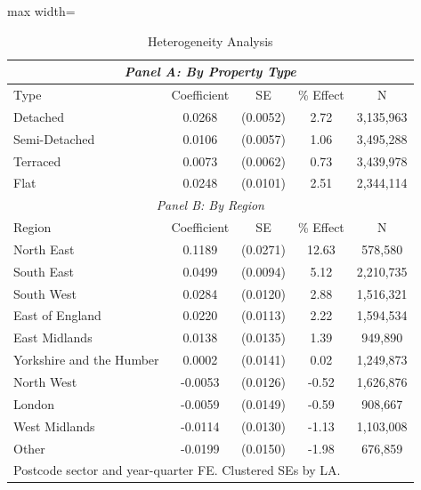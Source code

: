 \begin{table}[htbp]
\centering
\caption{Heterogeneity Analysis}
\label{tab:heterogeneity}
\begin{adjustbox}{max width=\textwidth}
\begin{tabular}{lcccc}
\hline\hline
\multicolumn{5}{c}{\textit{Panel A: By Property Type}} \\
\hline
Type & Coefficient & SE & \% Effect & N \\
\hline
Detached & 0.0268 & (0.0052) & 2.72 & 3,135,963 \\
Semi-Detached & 0.0106 & (0.0057) & 1.06 & 3,495,288 \\
Terraced & 0.0073 & (0.0062) & 0.73 & 3,439,978 \\
Flat & 0.0248 & (0.0101) & 2.51 & 2,344,114 \\
\hline
\multicolumn{5}{c}{\textit{Panel B: By Region}} \\
\hline
Region & Coefficient & SE & \% Effect & N \\
\hline
North East & 0.1189 & (0.0271) & 12.63 &   578,580 \\
South East & 0.0499 & (0.0094) & 5.12 & 2,210,735 \\
South West & 0.0284 & (0.0120) & 2.88 & 1,516,321 \\
East of England & 0.0220 & (0.0113) & 2.22 & 1,594,534 \\
East Midlands & 0.0138 & (0.0135) & 1.39 &   949,890 \\
Yorkshire and the Humber & 0.0002 & (0.0141) & 0.02 & 1,249,873 \\
North West & -0.0053 & (0.0126) & -0.52 & 1,626,876 \\
London & -0.0059 & (0.0149) & -0.59 &   908,667 \\
West Midlands & -0.0114 & (0.0130) & -1.13 & 1,103,008 \\
Other & -0.0199 & (0.0150) & -1.98 &   676,859 \\
\hline\hline
\multicolumn{5}{l}{\footnotesize Postcode sector and year-quarter FE. Clustered SEs by LA.} \\
\end{tabular}
\end{adjustbox}
\end{table}
